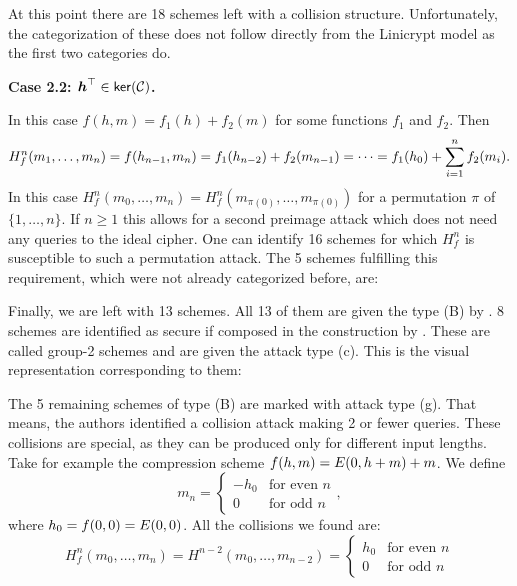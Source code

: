 At this point there are 18 schemes left with a collision structure.
Unfortunately, the categorization of these does not follow directly from the Linicrypt model as the first two categories do.

\textbf{Case 2.2: $\boldsymbol h^\top \in \mathsf{ker}(\mathcal{C})$.}

In this case $f(h,m) = f_1(h) + f_2(m)$ for some functions $f_1$ and $f_2$.
Then 
\[
H^n_f(m_1, \dots, m_{n}) = f(h_{n-1}, m_n) = f_1(h_{n-2}) + f_2(m_{n-1}) = \cdots = f_1(h_0) + \sum_{i=1}^n f_2(m_i).
\]
In this case $H^n_f(m_0, \dots, m_n) = H^n_f(m_{\pi(0)}, \dots, m_{\pi(0)})$ for a permutation $\pi$ of $\{1, \dots, n\}$.
If $n \geq 1$ this allows for a second preimage attack which does not need any queries to the ideal cipher.
One can identify 16 schemes for which $H^n_f$ is susceptible to such a permutation attack.
The 5 schemes fulfilling this requirement, which were not already categorized before, are:
\begin{center}
\end{center}

Finally, we are left with 13 schemes.
All 13 of them are given the type (B) by \cite{C:PreGovVan93}.
8 schemes are identified as secure if composed in the \MD construction by \cite{C:BlaRogShr02}.
These are called group-2 schemes and are given the attack type (c).
This is the visual representation corresponding to them:
\begin{center}
\end{center}


The 5 remaining schemes of type (B) are marked with attack type (g).
That means, the authors \cite{C:BlaRogShr02} identified a collision attack making 2 or fewer queries.
These collisions are special, as they can be produced only for different input lengths.
Take for example the compression scheme $f(h,m) = E(0,h+m) + m$.
We define 
\[
m_n = \begin{cases}
-h_0 & \textrm{for even $n$} \\
0 & \textrm{for odd $n$}
\end{cases},
\]
where $h_0 = f(0,0) = E(0,0)$.
All the collisions we found are:
\[
H^n_f(m_0, \dots, m_n) = H^{n-2}(m_0, \dots, m_{n-2}) = \begin{cases}
h_0 & \textrm{for even $n$} \\
0 & \textrm{for odd $n$}
\end{cases}
\]

